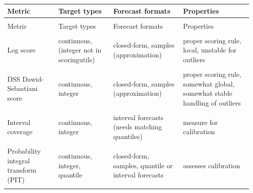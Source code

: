 \documentclass[article,shortnames]{jss}
\begin{document}
\begin{table}[h!]
\centering
\begin{longtable}[t]{>{\raggedright\arraybackslash}p{2.5cm}>{\raggedright\arraybackslash}p{2cm}>{\raggedright\arraybackslash}p{4.5cm}>{\raggedright\arraybackslash}p{4cm}}
\toprule
Metric & Target types & Forecast formats & Properties\\
\midrule
\endfirsthead
\multicolumn{4}{@{}l}{\textit{(continued)}}\\
\toprule
Metric & Target types & Forecast formats & Properties\\
\midrule
\endhead

\endfoot
\bottomrule
\endlastfoot
\cellcolor{gray!6}{CRPS (Continuous) ranked probability score} & \cellcolor{gray!6}{continuous, integer} & \cellcolor{gray!6}{closed-form, samples (approximation)} & \cellcolor{gray!6}{proper scoring rule, global, stable handling of outliers}\\
\addlinespace
Log score & continuous, (integer not in scoringutils) & closed-form, samples (approximation) & proper scoring rule, local, unstable for outliers\\
\addlinespace
\cellcolor{gray!6}{WIS (Weighted) interval score} & \cellcolor{gray!6}{continuous, integer} & \cellcolor{gray!6}{quantile or interval predictions} & \cellcolor{gray!6}{proper scoring rule, global, stable handling of outliers, converges to crps}\\
\addlinespace
DSS Dawid-Sebastiani score & continuous, integer & closed-form, samples (approximation) & proper scoring rule, somewhat global, somewhat stable handling of outliers\\
\addlinespace
\cellcolor{gray!6}{Brier score} & \cellcolor{gray!6}{binary} & \cellcolor{gray!6}{binary probabilities} & \cellcolor{gray!6}{proper scoring rule}\\
\addlinespace
Interval coverage & continuous, integer & interval forecasts (needs matching quantiles) & measure for calibration\\
\addlinespace
\cellcolor{gray!6}{Quantile coverage} & \cellcolor{gray!6}{continuous, integer} & \cellcolor{gray!6}{quantile or interval forecasts} & \cellcolor{gray!6}{measure for calibration}\\
\addlinespace
Probability integral transform (PIT) & continuous, integer, quantile & closed-form, samples, quantile or interval forecasts & assesses calibration\\
\addlinespace
\cellcolor{gray!6}{Sharpness} & \cellcolor{gray!6}{continuous, integer} & \cellcolor{gray!6}{closed-form, samples, quantile or interval forecasts} & \cellcolor{gray!6}{measures sharpness, slightly different depending on forecast format}\\

\end{longtable}
\end{table}
\end{document}
